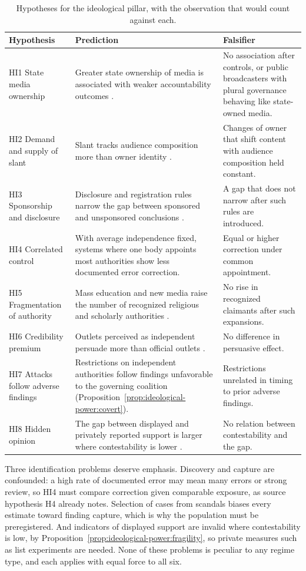\documentclass[11pt,letterpaper]{article}
\theoremstyle{definition}
\theoremstyle{remark}
\begin{document}
\begin{table}[t]
\centering
\small
\caption{Hypotheses for the ideological pillar, with the observation that would count against each.}
\label{tab:hypotheses}
\begin{tabularx}{\textwidth}{@{}L{3.0cm}YY@{}}
\toprule
Hypothesis & Prediction & Falsifier \\
\midrule
HI1 State media ownership & Greater state ownership of media is associated with weaker accountability outcomes \citep{djankov2003}. & No association after controls, or public broadcasters with plural governance behaving like state-owned media. \\
HI2 Demand and supply of slant & Slant tracks audience composition more than owner identity \citep{gentzkow2006}. & Changes of owner that shift content with audience composition held constant. \\
HI3 Sponsorship and disclosure & Disclosure and registration rules narrow the gap between sponsored and unsponsored conclusions \citep{lundh2017}. & A gap that does not narrow after such rules are introduced. \\
HI4 Correlated control & With average independence fixed, systems where one body appoints most authorities show less documented error correction. & Equal or higher correction under common appointment. \\
HI5 Fragmentation of authority & Mass education and new media raise the number of recognized religious and scholarly authorities \citep{eickelman1996,eisenstein1979}. & No rise in recognized claimants after such expansions. \\
HI6 Credibility premium & Outlets perceived as independent persuade more than official outlets \citep{stockmann2013,enikolopov2011}. & No difference in persuasive effect. \\
HI7 Attacks follow adverse findings & Restrictions on independent authorities follow findings unfavorable to the governing coalition (Proposition~\ref{prop:ideological-power:covert}). & Restrictions unrelated in timing to prior adverse findings. \\
HI8 Hidden opinion & The gap between displayed and privately reported support is larger where contestability is lower \citep{kuran1991}. & No relation between contestability and the gap. \\
\bottomrule
\end{tabularx}
\end{table}

Three identification problems deserve emphasis. Discovery and capture are confounded: a high rate of documented error may mean many errors or strong review, so HI4 must compare correction given comparable exposure, as source hypothesis H4 already notes. Selection of cases from scandals biases every estimate toward finding capture, which is why the population must be preregistered. And indicators of displayed support are invalid where contestability is low, by Proposition~\ref{prop:ideological-power:fragility}, so private measures such as list experiments are needed. None of these problems is peculiar to any regime type, and each applies with equal force to all six.
\end{document}
